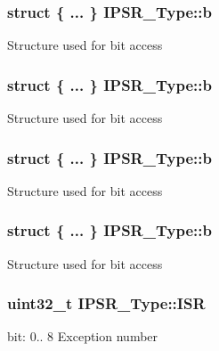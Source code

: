 \subsubsection[{\texorpdfstring{b}{b}}]{\setlength{\rightskip}{0pt plus 5cm}struct \{ ... \}   I\+P\+S\+R\+\_\+\+Type\+::b}\hypertarget{union_i_p_s_r___type_a4bc53b7f1c45dfecfa620b65dc4bd4c7}{}\label{union_i_p_s_r___type_a4bc53b7f1c45dfecfa620b65dc4bd4c7}
Structure used for bit access 
\subsubsection[{\texorpdfstring{b}{b}}]{\setlength{\rightskip}{0pt plus 5cm}struct \{ ... \}   I\+P\+S\+R\+\_\+\+Type\+::b}\hypertarget{union_i_p_s_r___type_a5e3c233a641aaa9539d50f79e7b374c5}{}\label{union_i_p_s_r___type_a5e3c233a641aaa9539d50f79e7b374c5}
Structure used for bit access 
\subsubsection[{\texorpdfstring{b}{b}}]{\setlength{\rightskip}{0pt plus 5cm}struct \{ ... \}   I\+P\+S\+R\+\_\+\+Type\+::b}\hypertarget{union_i_p_s_r___type_a791fd862a9e72737f1e3c17542ef70de}{}\label{union_i_p_s_r___type_a791fd862a9e72737f1e3c17542ef70de}
Structure used for bit access 
\subsubsection[{\texorpdfstring{b}{b}}]{\setlength{\rightskip}{0pt plus 5cm}struct \{ ... \}   I\+P\+S\+R\+\_\+\+Type\+::b}\hypertarget{union_i_p_s_r___type_ac3bf5939c6cca6068a8d6dcd215abeac}{}\label{union_i_p_s_r___type_ac3bf5939c6cca6068a8d6dcd215abeac}
Structure used for bit access 
\subsubsection[{\texorpdfstring{I\+SR}{ISR}}]{\setlength{\rightskip}{0pt plus 5cm}uint32\+\_\+t I\+P\+S\+R\+\_\+\+Type\+::\+I\+SR}\hypertarget{union_i_p_s_r___type_ab46e5f1b2f4d17cfb9aca4fffcbb2fa5}{}\label{union_i_p_s_r___type_ab46e5f1b2f4d17cfb9aca4fffcbb2fa5}
bit\+: 0.. 8 Exception number 
